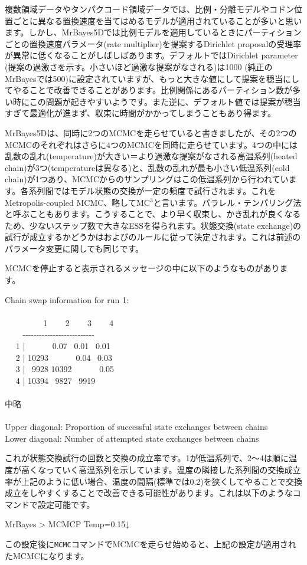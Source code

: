 \documentclass[titlepage,10pt,a4paper]{jsbook}
\newenvironment{cmd}{\begin{oframed}\raggedright\ttfamily\footnotesize\setlength{\baselineskip}{1.4em}}{\end{oframed}\vspace{-1em}}
\begin{document}
複数領域データやタンパクコード領域データでは、比例・分離モデルやコドン位置ごとに異なる置換速度を当てはめるモデルが適用されていることが多いと思います。しかし、MrBayes5Dでは比例モデルを適用しているときにパーティションごとの置換速度パラメータ(rate multiplier)を提案するDirichlet proposalの受理率が異常に低くなることがしばしばあります。デフォルトではDirichlet parameter (提案の過激さを示す。小さいほど過激な提案がなされる)は1000 (純正のMrBayesでは500)に設定されていますが、もっと大きな値にして提案を穏当にしてやることで改善できることがあります。比例関係にあるパーティション数が多い時にこの問題が起きやすいようです。また逆に、デフォルト値では提案が穏当すぎて最適化が進まず、収束に時間がかかってしまうこともあり得ます。

MrBayes5Dは、同時に2つのMCMCを走らせていると書きましたが、その2つのMCMCのそれぞれはさらに4つのMCMCを同時に走らせています。4つの中には乱数の乱れ(temperature)が大きい＝より過激な提案がなされる高温系列(heated chain)が3つ(temperatureは異なる)と、乱数の乱れが最も小さい低温系列(cold chain)が1つあり、MCMCからのサンプリングはこの低温系列から行われています。各系列間ではモデル状態の交換が一定の頻度で試行されます。これをMetropolis-coupled MCMC、略してMC$^{3}$と言います。パラレル・テンパリング法と呼ぶこともあります。こうすることで、より早く収束し、かき乱れが良くなるため、少ないステップ数で大きなESSを得られます。状態交換(state exchange)の試行が成立するかどうかは\citet{Metropolis1953}および\citet{Hastings1970}のルールに従って決定されます。これは前述のパラメータ変更に関しても同じです。

MCMCを停止すると表示されるメッセージの中に以下のようなものがあります。
\begin{cmd}
Chain swap information for run 1:\\
~\\
~ ~ ~ ~ ~ ~1~ ~ ~2~ ~ ~3~ ~ ~4\\
~ ~ ~{-}{-}{-}{-}{-}{-}{-}{-}{-}{-}{-}{-}{-}{-}{-}{-}{-}{-}{-}{-}{-}{-}{-}{-}{-}{-}\\
~ ~1 |~ ~ ~ ~ 0.07~ 0.01~ 0.01\\
~ ~2 | 10293~ ~ ~ ~ 0.04~ 0.03\\
~ ~3 |~ 9928 10392~ ~ ~ ~ 0.05\\
~ ~4 | 10394~ 9827~ 9919\\
~\\
中略\\
~\\
Upper diagonal: Proportion of successful state exchanges between chains\\
Lower diagonal: Number of attempted state exchanges between chains
\end{cmd}
これが状態交換試行の回数と交換の成立率です。1が低温系列で、2～4は順に温度が高くなっていく高温系列を示しています。温度の隣接した系列間の交換成立率が上記のように低い場合、温度の間隔(標準では0.2)を狭くしてやることで交換成立をしやすくすることで改善できる可能性があります。これは以下のようなコマンドで設定可能です。
\begin{cmd}
MrBayes {\textgreater} MCMCP Temp=0.15↓
\end{cmd}
この設定後に\texttt{MCMC}コマンドでMCMCを走らせ始めると、上記の設定が適用されたMCMCになります。
\end{document}
